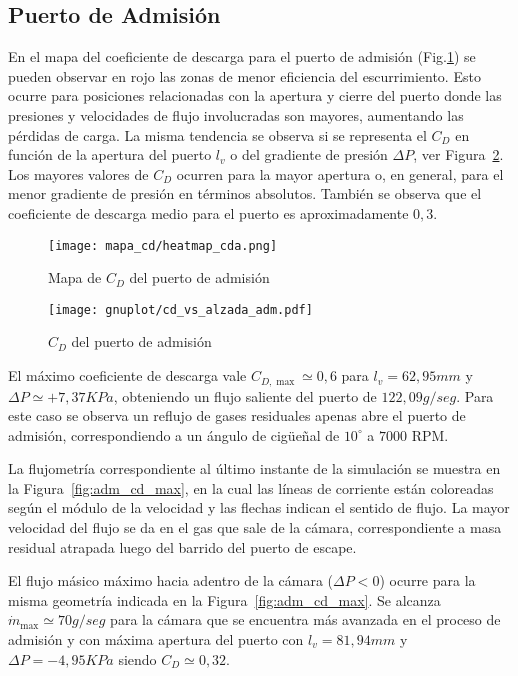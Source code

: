 \subsection{Puerto de Admisión}
%
En el mapa del coeficiente de descarga para el puerto de admisión
(Fig.\ref{fig:mapa_cd_admision}) se pueden observar en rojo las zonas de menor
eficiencia del escurrimiento.
%
Esto ocurre para posiciones relacionadas con la apertura y cierre del puerto
donde las presiones y velocidades de flujo involucradas son mayores, aumentando
las pérdidas de carga.
%
La misma tendencia se observa si se representa el $C_{D}$ en función de la
apertura del puerto $l_{v}$ o del gradiente de presión $\Delta P$, ver
Figura~\ref{fig:cd_admision}.
%
Los mayores valores de $C_{D}$ ocurren para la mayor apertura o, en general,
para el menor gradiente de presión en términos absolutos.
%
También se observa que el coeficiente de descarga medio para el puerto es
aproximadamente $0,3$.

\begin{figure}[h!]
    \centering
    \texttt{[image: mapa\_cd/heatmap\_cda.png]}
    \caption{Mapa de $C_{D}$ del puerto de admisión}\label{fig:mapa_cd_admision}
\end{figure}

\begin{figure}[h!]
    \centering
    \texttt{[image: gnuplot/cd\_vs\_alzada\_adm.pdf]}
    \caption{$C_{D}$ del puerto de admisión}\label{fig:cd_admision}
\end{figure}

El máximo coeficiente de descarga vale $C_{D,\max}\simeq 0,6$ para
$l_{v}=62,95 mm$ y $\Delta P\simeq +7,37 KPa$, obteniendo un flujo saliente del
puerto de $122,09 g/seg$.
%
Para este caso se observa un reflujo de gases residuales apenas abre el puerto
de admisión, correspondiendo a un ángulo de cigüeñal de $10^{\circ}$ a $7000$
RPM.


La flujometría correspondiente al último instante de la simulación se muestra en
la Figura~\ref{fig:adm_cd_max}, en la cual las líneas de corriente están
coloreadas según el módulo de la velocidad y las flechas indican el sentido de
flujo.
%
La mayor velocidad del flujo se da en el gas que sale de la cámara,
correspondiente a masa residual atrapada luego del barrido del puerto de escape.

El flujo másico máximo hacia adentro de la cámara ($\Delta P<0$) ocurre para la
misma geometría indicada en la Figura~\ref{fig:adm_cd_max}.
%
Se alcanza $\dot{m}_{\max}\simeq 70 g/seg$ para la cámara que se encuentra más
avanzada en el proceso de admisión y con máxima apertura del puerto con $l_{v}=81,94 mm$ y $\Delta P=-4,95 KPa$ siendo $C_{D}\simeq 0,32$.

